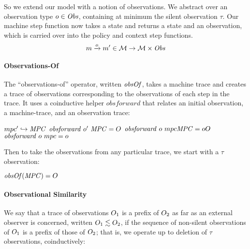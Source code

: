 \documentclass[acmsmall,review,anonymous]{acmart}\settopmatter{printfolios=true,printccs=false,printacmref=false}
\begin{document}
So we extend our model with a notion of observations. We abstract over an
observation type \(\obs \in \OBSS\), containing at minimum the silent observation
\(\tau\). Our machine step function now takes a state and returns a state and an observation,
which is carried over into the policy and context step functions.
%
\[\mach \stepstoobs[\obs] \mach' \in \MACHS \rightarrow \MACHS \times \OBSS \]
%

\paragraph*{Observations-Of}

The ``observations-of'' operator, written \(\obsof\), takes a machine trace and
creates a trace of observations corresponding to the observations of each step in
the trace. It uses a coinductive helper \(\mathit{obsforward}\) that relates an
initial observation, a machine-trace, and an observation trace:

              {\(\mpcstatename' \hookrightarrow \MPCT\)}
              {\(\mathit{obsforward} ~ \obs' ~ \MPCT = \obsT\)}
              {\(\mathit{obsforward} ~ \obs ~ \mpcstatename \MPCT = \obs\obsT\)}%
\judgment{}
         {\(\mathit{obsforward} ~ \obs ~ \mpcstatename = \obs\)}

Then to take the observations from any particular trace, we start with a \(\tau\) observation:

         {\(\obsof(\MPCT) = \obsT\)}

\paragraph*{Observational Similarity}

We say that a trace of observations $\obsT_1$ is a prefix of $\obsT_2$
as far as an external observer is concerned, written \(\obsT_1 \lesssim
\obsT_2\), if the sequence of
non-silent observations of $\obsT_1$ is a prefix of those of
$\obsT_2$; that is, we operate up to deletion of \(\tau\) observations,
coinductively:

\begin{minipage}{.3\textwidth}
  \judgment{}{\(\obsT \lesssim \obsT\)}
\end{minipage}
\begin{minipage}{.3\textwidth}
  \judgment{}{\(\tau \lesssim \obsT\)}
\end{minipage}
\begin{minipage}{.3\textwidth}
\end{minipage}
\end{document}
